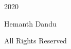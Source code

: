 \thispagestyle{empty}

\begin{center}
    \vspace*{18\baselineskip}
    \textcopyright \hspace{0.05cm} 2020
    
    Hemanth Dandu
    
    All Rights Reserved
\end{center}

\newpage